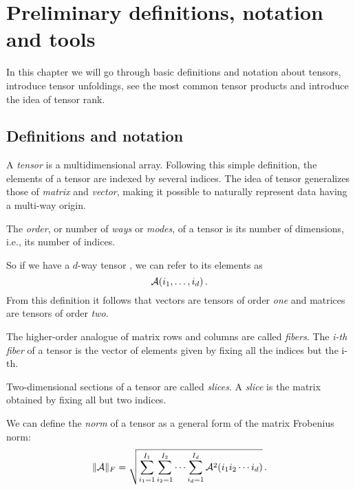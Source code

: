 \chapter{Preliminary definitions, notation and tools}

In this chapter we will go through basic definitions and notation about tensors, introduce tensor unfoldings, see the most common tensor products and introduce the idea of tensor rank.

\section{Definitions and notation}

A \emph{tensor} is a multidimensional array. Following this simple definition, the elements of a tensor are indexed by several indices.
The idea of tensor generalizes those of \emph{matrix} and \emph{vector}, making it possible to naturally represent data having a multi-way origin.

\begin{Def}
  The \emph{order}, or number of \emph{ways} or \emph{modes}, of a tensor is its number of dimensions, i.e., its number of indices.
\end{Def}
So if we have a $d$-way tensor \A, we can refer to its elements as
\begin{equation*}
  \mathcal{A}(i_1,\ldots,i_d)\, .
\end{equation*}
From this definition it follows that vectors are tensors of order \emph{one} and matrices are tensors of order \emph{two}.

\begin{Def}
  The higher-order analogue of matrix rows and columns are called \emph{fibers}. The \emph{i-th fiber} of a tensor \A is the vector of elements given by fixing all the indices but the i-th.
\end{Def}

\begin{Def}
  Two-dimensional sections of a tensor are called \emph{slices}. A \emph{slice} is the matrix obtained by fixing all but two indices.
\end{Def}

\begin{Def}
  We can define the \emph{norm} of a tensor as a general form of the matrix Frobenius norm:
  \begin{equation*}
  \|\mathcal{A}\|_F = \sqrt{\sum_{i_1 = 1}^{I_1}\sum_{i_2 = 1}^{I_2}\cdots\sum_{i_d = 1}^{I_d}\mathcal{A}^2(i_1 i_2 \cdots i_d)}\, .
  \end{equation*}
\end{Def}

